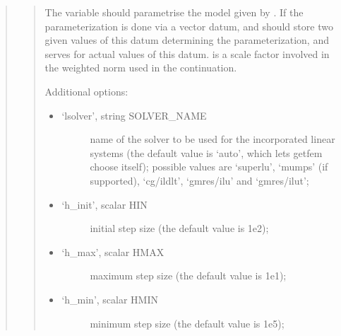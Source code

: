 \documentclass[a4paper,11pt,english]{sphinxmanual}
\begin{document}
\sphinxAtStartPar
{}
\begin{quote}

\sphinxAtStartPar
{}
\begin{quote}

\sphinxAtStartPar
The variable  should parametrise the model given by
. If the parameterization is done via a vector datum, 
and  should store two given values of this datum
determining the parameterization, and  serves for actual
values of this datum.  is a scale factor involved in the weighted
norm used in the continuation.

\sphinxAtStartPar
Additional options:
\begin{itemize}
\item {} \begin{description}
\item[{‘lsolver’, string SOLVER\_NAME}] \leavevmode
\sphinxAtStartPar
name of the solver to be used for the incorporated linear systems
(the default value is ‘auto’, which lets getfem choose itself);
possible values are ‘superlu’, ‘mumps’ (if supported), ‘cg/ildlt’,
‘gmres/ilu’ and ‘gmres/ilut’;

\end{description}

\item {} \begin{description}
\item[{‘h\_init’, scalar HIN}] \leavevmode
\sphinxAtStartPar
initial step size (the default value is 1e\sphinxhyphen{}2);

\end{description}

\item {} \begin{description}
\item[{‘h\_max’, scalar HMAX}] \leavevmode
\sphinxAtStartPar
maximum step size (the default value is 1e\sphinxhyphen{}1);

\end{description}

\item {} \begin{description}
\item[{‘h\_min’, scalar HMIN}] \leavevmode
\sphinxAtStartPar
minimum step size (the default value is 1e\sphinxhyphen{}5);


\end{description}
\end{itemize}
\end{quote}
\end{quote}
\end{document}
